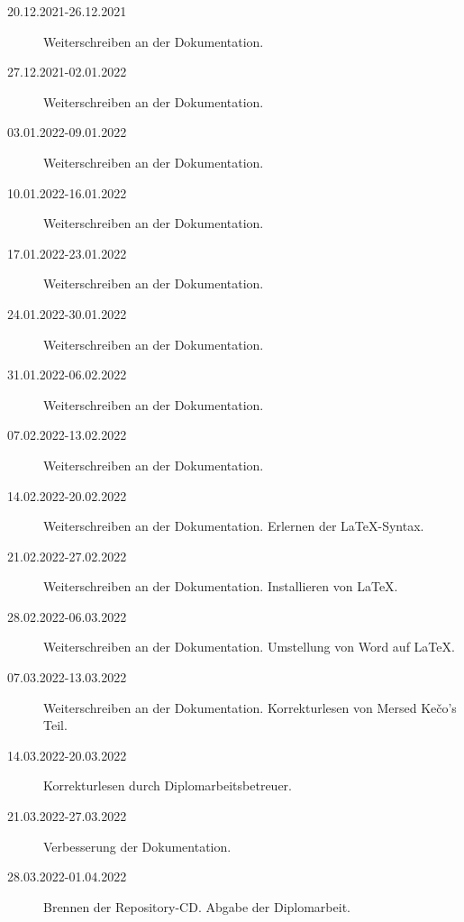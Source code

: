 \begin{description}
    \item[20.12.2021-26.12.2021] Weiterschreiben an der Dokumentation.
    \item[27.12.2021-02.01.2022] Weiterschreiben an der Dokumentation.
    \item[03.01.2022-09.01.2022] Weiterschreiben an der Dokumentation.
    \item[10.01.2022-16.01.2022] Weiterschreiben an der Dokumentation.
    \item[17.01.2022-23.01.2022] Weiterschreiben an der Dokumentation.
    \item[24.01.2022-30.01.2022] Weiterschreiben an der Dokumentation.
    \item[31.01.2022-06.02.2022] Weiterschreiben an der Dokumentation.
    \item[07.02.2022-13.02.2022] Weiterschreiben an der Dokumentation.
    \item[14.02.2022-20.02.2022] Weiterschreiben an der Dokumentation. Erlernen der LaTeX-Syntax.
    \item[21.02.2022-27.02.2022] Weiterschreiben an der Dokumentation. Installieren von LaTeX. 
    \item[28.02.2022-06.03.2022] Weiterschreiben an der Dokumentation. Umstellung von Word auf LaTeX.
    \item[07.03.2022-13.03.2022] Weiterschreiben an der Dokumentation. Korrekturlesen von Mersed Kečo’s Teil.
    \item[14.03.2022-20.03.2022] Korrekturlesen durch Diplomarbeitsbetreuer.
    \item[21.03.2022-27.03.2022] Verbesserung der Dokumentation.
    \item[28.03.2022-01.04.2022] Brennen der Repository-CD. Abgabe der Diplomarbeit.     
\end{description}